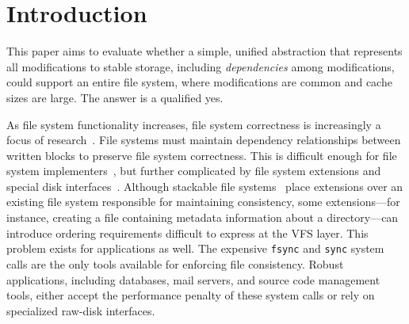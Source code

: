 
\section {Introduction}
\label{sec:intro}


This paper aims to evaluate whether a simple, unified abstraction that
represents all modifications to stable storage, including
\emph{dependencies} among modifications, could support an entire file
system, where modifications are common and cache sizes are large.
%
The answer is a qualified yes.


\begin{comment}
Ongoing massive growth in both disk capacities and user and application
storage requirements, combined with the increasing
disparity between disk and processor speeds, has led to ongoing
innovation in file system design.
%
File systems are expected to do more things: they can automatically encrypt
stored data~\cite{wright03ncryptfs}, support extensible metadata, such as
content indexes~\cite{gifford91semantic}, automatically
version~\cite{soules03metadata,fast04versionfs,quinlan02venti,cornell04wayback},
and even detect viruses~\cite{miretskiy04avfs}.
%
Improved disk interfaces can make use of file system usage patterns to
improve
performance~\cite{sivathanu03semantically-smart,sivathanu05database-aware}.
\end{comment}


As file system functionality increases, file system correctness is
 increasingly a focus of
 research~\cite{sivathanuetal05-logic,denehyetal05-journal-guided}.
%
File systems must maintain dependency relationships between written blocks
 to preserve file system correctness.
%
This is difficult enough for file system
 implementers~\cite{tweedie98journaling,mckusick99soft}, but further
 complicated by file system extensions and special disk interfaces~\cite{soules03metadata,fast04versionfs,quinlan02venti,cornell04wayback,wright03ncryptfs,sivathanu03semantically-smart,sivathanu05database-aware}.
%
Although stackable file
 systems~\cite{zadok00fist,zadok99extending,heidemann94filesystem,rosenthal90evolving}
 place extensions over an existing file system responsible for maintaining
 consistency, some extensions---for instance, creating a file containing
 metadata information about a directory---can introduce ordering
 requirements difficult to express at the VFS layer.
%
This problem exists for applications as well.
%
The expensive \texttt{fsync} and \texttt{sync} system calls are the only
 tools available for enforcing file consistency.
%
Robust applications, including databases, mail servers, and source code
 management tools, either accept the performance penalty of these system
 calls or rely on specialized raw-disk interfaces.



